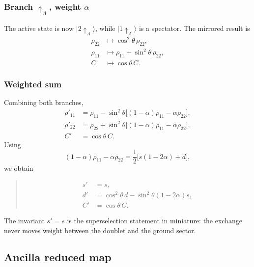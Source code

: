\documentclass[11pt,a4paper]{article}
\newcommand{\ket}[1]{|#1\rangle}
\newenvironment{resultbox}{\begin{quote}\small}{\end{quote}}
\begin{document}
\subsubsection*{Branch $\uparrow_A$, weight $\alpha$}

The active state is now $\ket{2\uparrow_A}$, while $\ket{1\uparrow_A}$ is a spectator. The mirrored result is
\begin{align}
\rho_{22}&\mapsto \cos^2\theta\,\rho_{22},\\
\rho_{11}&\mapsto \rho_{11}+\sin^2\theta\,\rho_{22},\\
C&\mapsto \cos\theta\,C.
\end{align}

\subsubsection*{Weighted sum}

Combining both branches,
\begin{align}
\rho'_{11}&=\rho_{11}-\sin^2\theta\big[(1-\alpha)\rho_{11}-\alpha\rho_{22}\big],\\
\rho'_{22}&=\rho_{22}+\sin^2\theta\big[(1-\alpha)\rho_{11}-\alpha\rho_{22}\big],\\
C'&=\cos\theta\,C.
\end{align}
Using
\begin{equation}
(1-\alpha)\rho_{11}-\alpha\rho_{22}
=\frac12\big[s(1-2\alpha)+d\big],
\end{equation}
we obtain
\begin{resultbox}
\begin{align}
s'&=s,\\
d'&=\cos^2\theta\,d-\sin^2\theta(1-2\alpha)s,\\
C'&=\cos\theta\,C.
\end{align}
\end{resultbox}

The invariant $s'=s$ is the superselection statement in miniature: the exchange never moves weight between the doublet and the ground sector.

\subsection{Ancilla reduced map}
\end{document}
